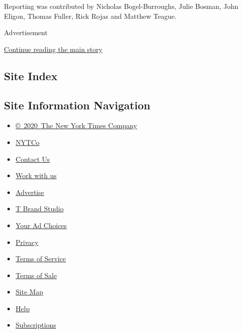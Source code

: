 Reporting was contributed by Nicholas Bogel-Burroughs, Julie Bosman,
John Eligon, Thomas Fuller, Rick Rojas and Matthew Teague.

Advertisement

\protect\hyperlink{after-bottom}{Continue reading the main story}

\hypertarget{site-index}{%
\subsection{Site Index}\label{site-index}}

\hypertarget{site-information-navigation}{%
\subsection{Site Information
Navigation}\label{site-information-navigation}}

\begin{itemize}
\tightlist
\item
  \href{https://help.nytimes3xbfgragh.onion/hc/en-us/articles/115014792127-Copyright-notice}{©~2020~The
  New York Times Company}
\end{itemize}

\begin{itemize}
\tightlist
\item
  \href{https://www.nytco.com/}{NYTCo}
\item
  \href{https://help.nytimes3xbfgragh.onion/hc/en-us/articles/115015385887-Contact-Us}{Contact
  Us}
\item
  \href{https://www.nytco.com/careers/}{Work with us}
\item
  \href{https://nytmediakit.com/}{Advertise}
\item
  \href{http://www.tbrandstudio.com/}{T Brand Studio}
\item
  \href{https://www.nytimes3xbfgragh.onion/privacy/cookie-policy\#how-do-i-manage-trackers}{Your
  Ad Choices}
\item
  \href{https://www.nytimes3xbfgragh.onion/privacy}{Privacy}
\item
  \href{https://help.nytimes3xbfgragh.onion/hc/en-us/articles/115014893428-Terms-of-service}{Terms
  of Service}
\item
  \href{https://help.nytimes3xbfgragh.onion/hc/en-us/articles/115014893968-Terms-of-sale}{Terms
  of Sale}
\item
  \href{https://spiderbites.nytimes3xbfgragh.onion}{Site Map}
\item
  \href{https://help.nytimes3xbfgragh.onion/hc/en-us}{Help}
\item
  \href{https://www.nytimes3xbfgragh.onion/subscription?campaignId=37WXW}{Subscriptions}
\end{itemize}
